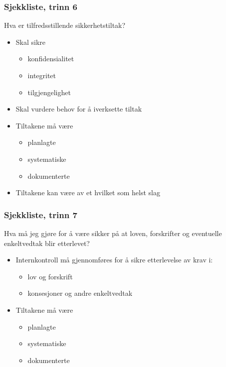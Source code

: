 \documentclass[11pt]{article}
\begin{document}
\subsubsection{Sjekkliste, trinn 6}
\label{sec-17.1.6}

    Hva er tilfredsstillende sikkerhetstiltak?
\begin{itemize}
\item Skal sikre

\begin{itemize}
\item konfidensialitet
\item integritet
\item tilgjengelighet
\end{itemize}

\item Skal vurdere behov for å iverksette tiltak
\item Tiltakene må være

\begin{itemize}
\item planlagte
\item systematiske
\item dokumenterte
\end{itemize}

\item Tiltakene kan være av et hvilket som helst slag
\end{itemize}
\subsubsection{Sjekkliste, trinn 7}
\label{sec-17.1.7}

    Hva må jeg gjøre for å være sikker på at loven, forskrifter og eventuelle enkeltvedtak blir etterlevet?
\begin{itemize}
\item Internkontroll må gjennomføres for å sikre etterlevelse av krav i:

\begin{itemize}
\item lov og forskrift
\item konsesjoner og andre enkeltvedtak
\end{itemize}

\item Tiltakene må være

\begin{itemize}
\item planlagte
\item systematiske
\item dokumenterte
\end{itemize}

\end{itemize}
\end{document}

